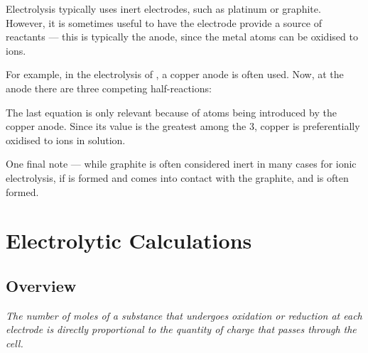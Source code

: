 				Electrolysis typically uses inert electrodes, such as platinum or graphite. However, it is sometimes useful to have the
				electrode provide a source of reactants --- this is typically the anode, since the metal atoms can be oxidised to ions.

				For example, in the electrolysis of , a copper anode is often used. Now, at the anode there are three
				competing half-reactions:



				The last equation is only relevant because of  atoms being introduced by the copper anode. Since its \Eox{} value is the
				greatest among the 3, copper is preferentially oxidised to  ions in solution.

				One final note --- while graphite is often considered inert in many cases for ionic electrolysis, if  is formed and
				comes into contact with the graphite,  and  is often formed.








	\section{Electrolytic Calculations}

		\subsection{Overview}

			\textit{The number of moles of a substance that undergoes oxidation or reduction at each electrode is directly proportional to
			the quantity of charge that passes through the cell.}

